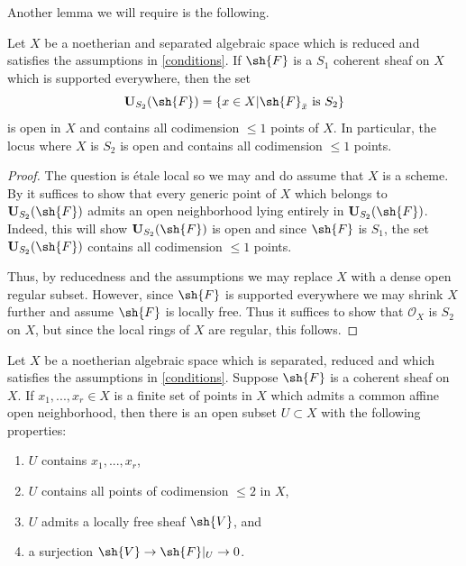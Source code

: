 \documentclass[12pt]{amsart}
\begin{document}
Another lemma we will require is the following.

\begin{lemma} \label{stwocoherent} Let $X$ be a noetherian and separated algebraic space which is reduced and satisfies the assumptions in \ref{conditions}. If $\sh{F}$ is a $S_1$ coherent sheaf on $X$ which is supported everywhere, then the set
\[\mathbf{U}_{S_2}(\sh{F})=\{x \in X|\sh{F}_{\bar{x}} \textrm{ is } S_2\}\] 
is open in $X$ and contains all codimension $\leq 1$ points of $X$. In particular, the locus where $X$ is $S_2$ is open and contains all codimension $\leq 1$ points. \end{lemma}

\begin{proof} The question is \'etale local so we may and do assume that $X$ is a scheme. By \cite[Cor. 6.11.7]{EGAIV.2} it suffices to show that every generic point of $X$ which belongs to $\mathbf{U}_{S_2}(\sh{F})$ admits an open neighborhood lying entirely in $\mathbf{U}_{S_2}(\sh{F})$. Indeed, this will show $\mathbf{U}_{S_2}(\sh{F})$ is open and since $\sh{F}$ is $S_1$, the set $\mathbf{U}_{S_2}(\sh{F})$ contains all codimension $\leq 1$ points. 

Thus, by reducedness and the assumptions we may replace $X$ with a dense open regular subset. However, since $\sh{F}$ is supported everywhere we may shrink $X$ further and assume $\sh{F}$ is locally free. Thus it suffices to show that $\mathcal{O}_X$ is $S_2$ on $X$, but since the local rings of $X$ are regular, this follows. \end{proof}

\begin{Theorem} \label{thm:singlecoherent} Let $X$ be a noetherian algebraic space which is separated, reduced and which satisfies the assumptions in \ref{conditions}. Suppose $\sh{F}$ is a coherent sheaf on $X$. If $x_1,...,x_r \in X$ is a finite set of points in $X$ which admits a common affine open neighborhood, then there is an open subset $U \subset X$ with the following properties:
\begin{enumerate}
\item $U$ contains $x_1,...,x_r$,
\item $U$ contains all points of codimension $\leq 2$ in $X$, 
\item $U$ admits a locally free sheaf $\sh{V}$, and 
\item a surjection $\sh{V} \to \sh{F}|_U \to 0$.
\end{enumerate}
\end{Theorem} 
\end{document}
